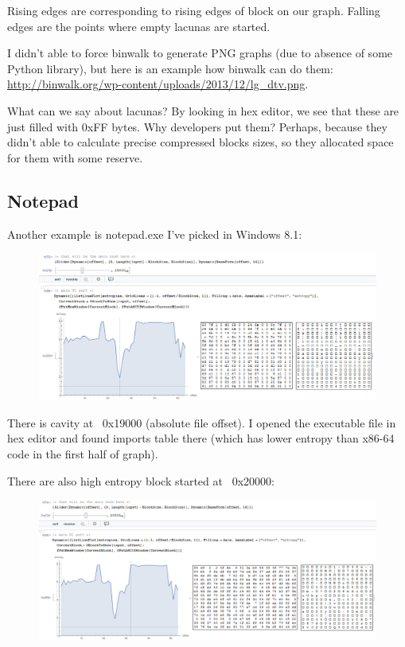Rising edges are corresponding to rising edges of block on our graph.
Falling edges are the points where empty lacunas are started.

I didn't able to force binwalk to generate PNG graphs (due to absence of some Python library), but here is an example how binwalk
can do them: \url{http://binwalk.org/wp-content/uploads/2013/12/lg_dtv.png}.

What can we say about lacunas? By looking in hex editor, we see that these are just filled with 0xFF bytes.
Why developers put them? Perhaps, because they didn't able to calculate precise compressed blocks sizes, so they allocated space
for them with some reserve.

\subsection{Notepad}


Another example is notepad.exe I've picked in Windows 8.1:

\begin{figure}[H]
\centering
\includegraphics[scale=\FigScale]{ff/entropy/notepad1.png}
\end{figure}

There is cavity at ~0x19000 (absolute file offset).
I opened the executable file in hex editor and found imports table there (which has lower entropy than x86-64 code
in the first half of graph).

There are also high entropy block started at ~0x20000:

\begin{figure}[H]
\centering
\includegraphics[scale=\FigScale]{ff/entropy/notepad2.png}
\end{figure}

